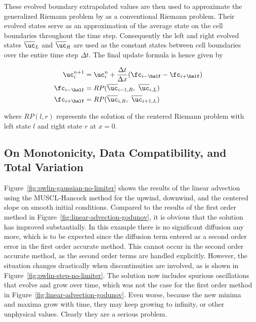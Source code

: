 These evolved boundary extrapolated values are then used to approximate the generalized Riemann
problem by as a conventional Riemann problem. Their evolved states serve as an approximation of the average state on the cell boundaries throughout the time step. Consequently the left and right evolved states $\overline{\uc}_{L}$ and $\overline{\uc}_{R}$ are used as the constant states between cell boundaries over the entire time step $\Delta t$. The final update formula is hence given by

\begin{align}
 \uc_i^{n+1} &= \uc_i^n + \frac{\Delta t}{\Delta x} (\fc_{i-\half} - \fc_{i+\half}) \\
 \fc_{i-\half} &= RP(\overline{\uc}_{i-1, R},\ \overline{\uc}_{i,L}) \\
 \fc_{i+\half} &= RP(\overline{\uc}_{i, R},\ \overline{\uc}_{i+1,L})
\end{align}

where $RP(l, r)$ represents the solution of the centered Riemann problem with left state $l$ and
right state $r$ at $x = 0$.









\subsection{On Monotonicity, Data Compatibility, and Total Variation}

Figure~\ref{fig:pwlin-gaussian-no-limiter} shows the results of the linear advection using the
MUSCL-Hancock method for the upwind, downwind, and the centered slope on smooth initial conditions.
Compared to the results of the first order method in Figure~\ref{fig:linear-advection-godunov}, it
is obvious that the solution has improved substantially. In this example there is no significant
diffusion any more, which is to be expected since the diffusion term entered as a second order error
in the first order accurate method. This cannot occur in the second order accurate method, as the
second order terms are handled explicitly. However, the situation changes drastically when
discontinuities are involved, as is shown in Figure~\ref{fig:pwlin-step-no-limiter}. The solution
now includes spurious oscillations that evolve and grow over time, which was not the case for the
first order method in Figure~\ref{fig:linear-advection-godunov}. Even worse, because the new
minima and maxima grow with time, they may keep growing to infinity, or other unphysical values.
Clearly they are a serious problem.


